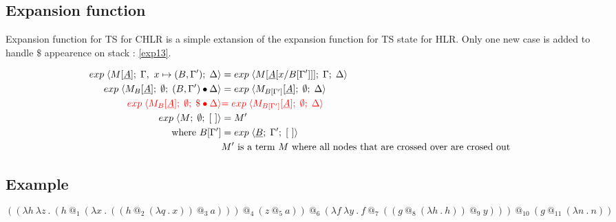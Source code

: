 \documentclass[a4paper, 10pt]{article}
\begin{document}
\subsection{Expansion function}

Expansion function for TS for CHLR is a simple extansion of the expansion function for TS state for HLR.
Only one new case is added to handle $\$$ appearence on stack : \eqref{exp13}.

\begin{align}
  \label{exp11} exp\; \langle M[\underline{A}];\; \Gamma,\ x \mapsto (B, \Gamma');\; \Delta \rangle
  &= exp\; \langle M[\underline{A}[x / B[\Gamma']]];\; \Gamma;\; \Delta \rangle \\
  \label{exp12} exp\; \langle M_B[\underline{A}];\; \emptyset;\; (B,\Gamma')\bullet\Delta \rangle
  &= exp\; \langle M_{B[\Gamma']}[\underline{A}];\; \emptyset;\; \Delta \rangle\\
  \label{exp13}  {\color{red} exp\; \langle M_B[\underline{A}];\; \emptyset;\;  \$ \bullet \Delta \rangle}
  &{\color{red}= exp\; \langle M_{B[\Gamma']}[\underline{A}];\; \emptyset;\; \Delta \rangle } \\
  \label{exp14} exp\; \langle M;\; \emptyset;\; [\ ] \rangle &= M' \\
  \textnormal{where } B[\Gamma'] &= exp\; \langle \underline{B};\; \Gamma';\; [\ ] \rangle \\
  & M' \textnormal{ is a term } M \textnormal{ where all nodes that are crossed over are crosed out }
\end{align}


\subsection{Example}
$$((\lambda h\ \lambda z\ .\ (h\ @_1\ (\lambda x\ .\ ((h\ @_2\ (\lambda q\ .\ x))\ @_3\ a)))\ @_4\ (z\ @_5\ a))\
@_6\ (\lambda f\ \lambda y\ .\ f\ @_7\ ((g\ @_8\ (\lambda h\ .\ h))\ @_9\ y)))\ @_{10}\ (g\ @_{11}\ (\lambda n\ .\ n))
$$
\end{document}
